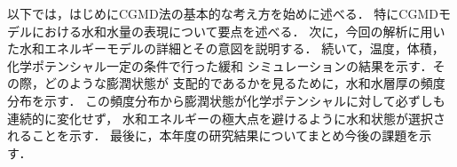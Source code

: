 以下では，はじめにCGMD法の基本的な考え方を始めに述べる．
特にCGMDモデルにおける水和水量の表現について要点を述べる．
次に，今回の解析に用いた水和エネルギーモデルの詳細とその意図を説明する．
続いて，温度，体積，化学ポテンシャル一定の条件で行った緩和
シミュレーションの結果を示す．その際，どのような膨潤状態が
支配的であるかを見るために，水和水層厚の頻度分布を示す．
この頻度分布から膨潤状態が化学ポテンシャルに対して必ずしも連続的に変化せず，
水和エネルギーの極大点を避けるように水和状態が選択されることを示す．
最後に，本年度の研究結果についてまとめ今後の課題を示す．
